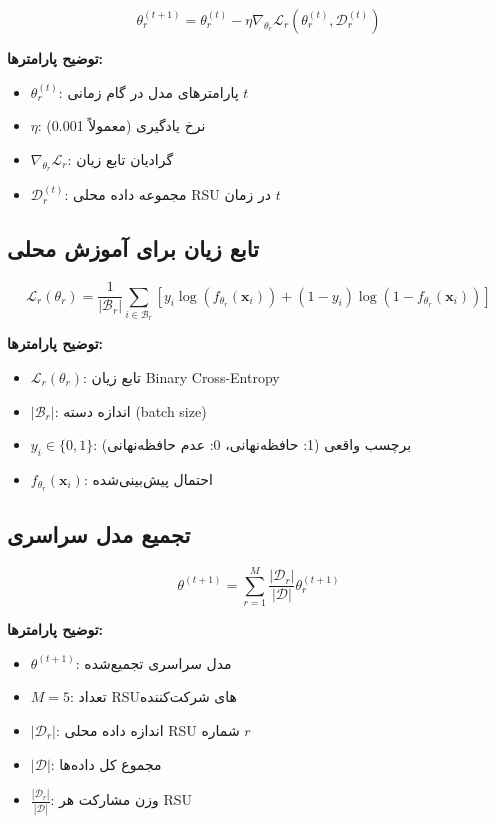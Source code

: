 \documentclass[11pt]{article}
\begin{document}
\begin{equation}
\theta_r^{(t+1)} = \theta_r^{(t)} - \eta \nabla_{\theta_r} \mathcal{L}_r(\theta_r^{(t)}, \mathcal{D}_r^{(t)})
\label{eq:local_update}
\end{equation}

\textbf{توضیح پارامترها:}
\begin{itemize}
    \item $\theta_r^{(t)}$: پارامترهای مدل در گام زمانی $t$
    \item $\eta$: نرخ یادگیری (معمولاً 0.001)
    \item $\nabla_{\theta_r} \mathcal{L}_r$: گرادیان تابع زیان
    \item $\mathcal{D}_r^{(t)}$: مجموعه داده محلی RSU در زمان $t$
\end{itemize}

\subsection{تابع زیان برای آموزش محلی}

\begin{equation}
\mathcal{L}_r(\theta_r) = \frac{1}{|\mathcal{B}_r|} \sum_{i \in \mathcal{B}_r} \left[ y_i \log(f_{\theta_r}(\mathbf{x}_i)) + (1-y_i) \log(1-f_{\theta_r}(\mathbf{x}_i)) \right]
\label{eq:loss_function}
\end{equation}

\textbf{توضیح پارامترها:}
\begin{itemize}
    \item $\mathcal{L}_r(\theta_r)$: تابع زیان Binary Cross-Entropy
    \item $|\mathcal{B}_r|$: اندازه دسته (batch size)
    \item $y_i \in \{0, 1\}$: برچسب واقعی (1: حافظه‌نهانی، 0: عدم حافظه‌نهانی)
    \item $f_{\theta_r}(\mathbf{x}_i)$: احتمال پیش‌بینی‌شده
\end{itemize}

\subsection{تجمیع مدل سراسری}

\begin{equation}
\theta^{(t+1)} = \sum_{r=1}^{M} \frac{|\mathcal{D}_r|}{|\mathcal{D}|} \theta_r^{(t+1)}
\label{eq:fedavg}
\end{equation}

\textbf{توضیح پارامترها:}
\begin{itemize}
    \item $\theta^{(t+1)}$: مدل سراسری تجمیع‌شده
    \item $M = 5$: تعداد RSUهای شرکت‌کننده
    \item $|\mathcal{D}_r|$: اندازه داده محلی RSU شماره $r$
    \item $|\mathcal{D}|$: مجموع کل داده‌ها
    \item $\frac{|\mathcal{D}_r|}{|\mathcal{D}|}$: وزن مشارکت هر RSU
\end{itemize}
\end{document}
